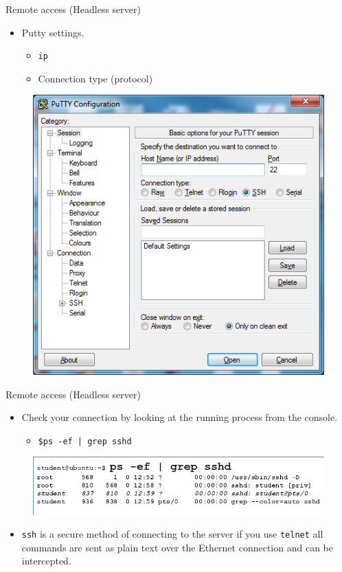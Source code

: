 \documentclass{beamer}
\begin{document}
\begin{frame}{Remote access (Headless server)}
  \begin{itemize}
    \item Putty settings.
      \begin{itemize}
        \item \texttt{ip}
        \item Connection type (protocol)
      \end{itemize}
  \end{itemize}
  \begin{figure}
    \begin{center}
      \includegraphics[width=0.5\linewidth]{Putty1.png}
    \end{center}
  \end{figure}
\end{frame}

\begin{frame}{Remote access (Headless server)}
  \begin{itemize}
    \item Check your connection by looking at the running process from the console.
      \begin{itemize}
        \item \texttt{\$ps -ef | grep sshd}
      \end{itemize}
  \end{itemize}
  \begin{figure}
    \begin{center}
      \includegraphics[width=1\linewidth]{ps.png}
    \end{center}
  \end{figure}
  \begin{itemize}
      \item \texttt{ssh} is a secure method of connecting to the server if you use \texttt{telnet} all commands are sent as plain text over the Ethernet connection and can be intercepted.
  \end{itemize}
\end{frame}
\end{document}
